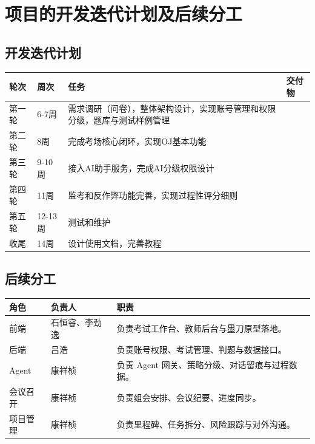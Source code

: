 \documentclass[UTF8,12pt,a4paper]{ctexart}
\begin{document}
\section{项目的开发迭代计划及后续分工}

\subsection{开发迭代计划}

\begin{table}[H]
\centering
\small
\begin{tabularx}{\textwidth}{|p{1.4cm}|p{2.0cm}|Y|p{3.0cm}|}
\hline
\textbf{轮次} & \textbf{周次} & \textbf{任务} & \textbf{交付物} \\ \hline
第一轮 & 6-7周 & 需求调研（问卷），整体架构设计，实现账号管理和权限分级，题库与测试样例管理& \\ \hline
第二轮 & 8周 & 完成考场核心闭环，实现OJ基本功能& \\ \hline
第三轮 & 9-10周& 接入AI助手服务，完成AI分级权限设计& \\ \hline
第四轮 & 11周& 监考和反作弊功能完善，实现过程性评分细则& \\ \hline
第五轮 & 12-13周& 测试和维护& \\ \hline
收尾 &   14周&  设计使用文档，完善教程& \\ \hline
\end{tabularx}
\end{table}

\subsection{后续分工}

\begin{table}[H]
\centering
\small
\begin{tabularx}{\textwidth}{|p{3.0cm}|p{4.0cm}|Y|}
\hline
\textbf{角色} & \textbf{负责人} & \textbf{职责} \\ \hline
前端 & 石恒睿、李劲逸 & 负责考试工作台、教师后台与墨刀原型落地。 \\ \hline
后端 & 吕浩 & 负责账号权限、考试管理、判题与数据接口。 \\ \hline
Agent & 康祥桢 & 负责 Agent 网关、策略分级、对话留痕与过程数据。 \\ \hline
会议召开 & 康祥桢 & 负责组会安排、会议纪要、进度同步。 \\ \hline
项目管理 & 康祥桢 & 负责里程碑、任务拆分、风险跟踪与对外沟通。 \\ \hline
\end{tabularx}
\end{table}
\end{document}
